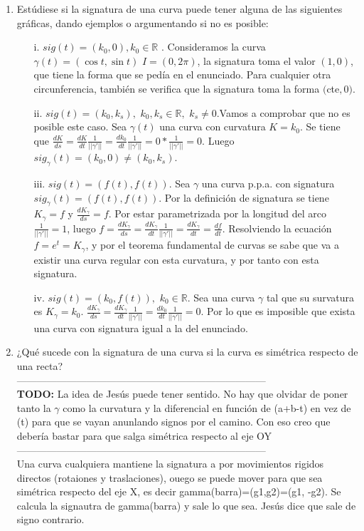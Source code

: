 \documentclass[12pt,a4paper]{article}
\newcommand{\todo}[1]{{\large \color{red} \textbf{TODO: }#1 }}
\begin{document}
\begin{enumerate}
\item Estúdiese si la signatura de una curva puede tener alguna de las
  siguientes gráficas, dando ejemplos o argumentando si no es posible:
  \begin{enumerate}
  \item[i.]\textbf{$sig(t)=(k_{0},0), k_{0}\in \mathbb{R}$ }. Consideramos
    la curva $\gamma(t)=(\cos t, \sin t)$ $I=(0,2\pi)$, la signatura toma
    el valor $(1,0)$, que tiene la forma que se pedía en el enunciado. Para
    cualquier otra circunferencia, también se verifica que la signatura
    toma la forma $($cte$,0)$.
  \item[ii.]\textbf{$sig(t)=(k_{0}, k_{s}),\,\,
      k_{0},k_{s}\in\mathbb{R},\,\, k_{s}\ne0$}.Vamos
    a comprobar que no es posible este caso. Sea $\gamma(t)$ una curva con
    curvatura $K=k_{0}$. Se tiene que
    $\frac{dK}{ds} = \frac{dK}{dt} \frac{1}{||\gamma'||} =
    \frac{dk_{0}}{dt} \frac{1}{||\gamma'||} = 0 * \frac{1}{||\gamma'||} =
    0$. Luego $sig_{\gamma}(t) = (k_{0}, 0) \ne (k_{0}, k_{s})$.
  \item[iii.]\textbf{$sig(t)=(f(t),f(t))$}. Sea $\gamma$ una curva
    p.p.a. con signatura $sig_{\gamma}(t)=(f(t),f(t))$. Por la definición
    de signatura se tiene $K_{\gamma}=f$ y $\frac{dK_{\gamma}}{ds}=f$. Por
    estar parametrizada por la longitud del arco
    $\frac{1}{||\gamma'||} = 1$, luego
    $f = \frac{dK_{\gamma}}{ds} = \frac{dK_{\gamma}}{dt}
    \frac{1}{||\gamma'||} = \frac{dK_{\gamma}}{dt} = \frac{df}{dt}$.
    Resolviendo la ecuación $f=e^{t}=K_{\gamma}$, y por el teorema
    fundamental de curvas se sabe que va a existir una curva regular con
    esta curvatura, y por tanto con esta signatura.
  \item[iv.]\textbf{$sig(t)=(k_{0}, f(t)),\,\, k_{0}\in\mathbb{R}$}. Sea
    una curva $\gamma$ tal que su survatura es $K_{\gamma} = k_{0}$.
    $\frac{dK_{\gamma}}{ds} = \frac{dK_{\gamma}}{dt} \frac{1}{||\gamma'||}
    = \frac{dk_{0}}{dt} \frac{1}{||\gamma'||} = 0$.
    Por lo que es imposible que exista una curva con signatura igual a la
    del enunciado.
  \end{enumerate}

\item ¿Qué sucede con la signatura de una curva si la curva es simétrica
  respecto de una recta? \\
  ---------------------------------------------------------------------------\\
  \todo{La idea de Jesús puede tener sentido. No hay que olvidar de poner
    tanto la $\gamma$ como la curvatura y la diferencial en función de
    (a+b-t) en vez de (t) para que se vayan anunlando signos por el
    camino. Con eso creo que debería bastar para que salga simétrica
    respecto al eje OY}
  ---------------------------------------------------------------------------\\
  Una curva cualquiera mantiene la signatura a por movimientos rigidos
  directos (rotaiones y traslaciones), ouego se puede mover para que sea
  simétrica respecto del eje X, es decir gamma(barra)=(g1,g2)=(g1, -g2).
  Se calcula la signautra de gamma(barra) y sale lo que sea. Jesús dice que
  sale de signo contrario.


\end{enumerate}
\end{document}
